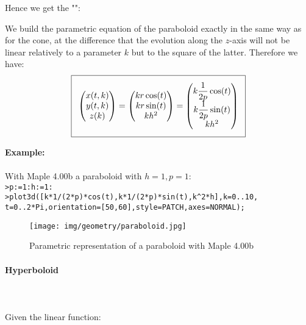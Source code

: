 {	Hence we get the "":
	
	We build the parametric equation of the paraboloid exactly in the same way as for the cone, at the difference that the evolution along the $z$-axis will not be linear relatively to a parameter $k$ but to the square of the latter. Therefore we have:
	\begin{equation}
	  \addtolength{\fboxsep}{5pt}
	   \boxed{
	   \begin{gathered}
	   		\begin{pmatrix}
	   		x(t,k)\\y(t,k)\\z(k)
	   		\end{pmatrix}=
	   		\begin{pmatrix}
	   		kr\cos(t)\\kr\sin(t)\\kh^2
	   		\end{pmatrix}=
	   		\begin{pmatrix}
	   		k\dfrac{1}{2p}\cos(t)\\k\dfrac{1}{2p}\sin(t)\\kh^2
	   		\end{pmatrix}
	   \end{gathered}
	   }
	\end{equation}
	\begin{tcolorbox}[colframe=black,colback=white,sharp corners]
	\textbf{{\Large {}}Example:}\\\\
	With Maple 4.00b a paraboloid with $h=1,p=1$:\\

	\texttt{>p:=1:h:=1:\\
	>plot3d([k*1/(2*p)*cos(t),k*1/(2*p)*sin(t),k\string^2*h],k=0..10,\\
	t=0..2*Pi,orientation=[50,60],style=PATCH,axes=NORMAL); 
	}
	\begin{figure}[H]
		\centering
		\texttt{[image: img/geometry/paraboloid.jpg]}
		\caption{Parametric representation of a paraboloid with Maple 4.00b}
	\end{figure}
	\end{tcolorbox}
	
	\pagebreak
	\paragraph{Hyperboloid}\label{hyperboloid}\mbox{}\\\\
	Given the linear function:
	
}
